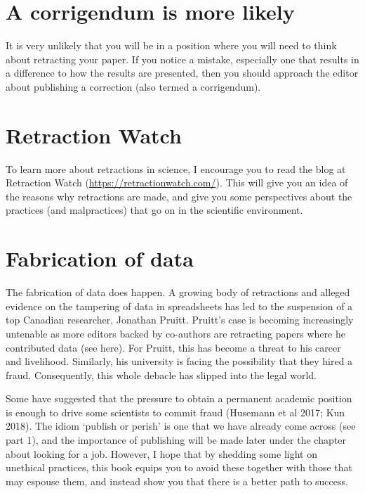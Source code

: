 \documentclass[
]{krantz}
\begin{document}
\hypertarget{a-corrigendum-is-more-likely}{%
\section{A corrigendum is more likely}\label{a-corrigendum-is-more-likely}}

It is very unlikely that you will be in a position where you will need to think about retracting your paper. If you notice a mistake, especially one that results in a difference to how the results are presented, then you should approach the editor about publishing a correction (also termed a corrigendum).

\hypertarget{retraction-watch}{%
\section{Retraction Watch}\label{retraction-watch}}

To learn more about retractions in science, I encourage you to read the blog at Retraction Watch (\url{https://retractionwatch.com/}). This will give you an idea of the reasons why retractions are made, and give you some perspectives about the practices (and malpractices) that go on in the scientific environment.

\hypertarget{fabrication-of-data}{%
\section{Fabrication of data}\label{fabrication-of-data}}

The fabrication of data does happen. A growing body of retractions and alleged evidence on the tampering of data in spreadsheets has led to the suspension of a top Canadian researcher, Jonathan Pruitt. Pruitt's case is becoming increasingly untenable as more editors backed by co-authors are retracting papers where he contributed data (see here). For Pruitt, this has become a threat to his career and livelihood. Similarly, his university is facing the possibility that they hired a fraud. Consequently, this whole debacle has slipped into the legal world.

Some have suggested that the pressure to obtain a permanent academic position is enough to drive some scientists to commit fraud (Husemann et al 2017; Kun 2018). The idiom `publish or perish' is one that we have already come across (see part 1), and the importance of publishing will be made later under the chapter about looking for a job. However, I hope that by shedding some light on unethical practices, this book equips you to avoid these together with those that may espouse them, and instead show you that there is a better path to success.
\end{document}

